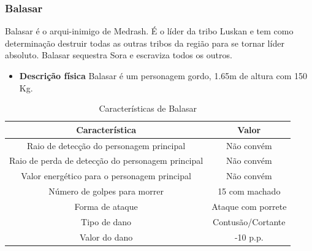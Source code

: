 \subsubsection{Balasar}
Balasar é o arqui-inimigo de Medrash. É o líder da tribo Luskan e tem como determinação destruir todas as outras tribos da região para se tornar líder absoluto. Balasar sequestra Sora e escraviza todos os outros.
\begin{itemize}
\item {\bf Descrição física}
Balasar é um personagem gordo, 1.65m de altura com 150 Kg.
\end{itemize}
\newpage
\begin{table}[H]
\begin{center}
\begin{tabular}{|c|c|}
\hline 
\textbf{Característica} & \textbf{Valor} \\ 
\hline 
Raio de detecção do personagem principal & Não convém \\ 
\hline 
Raio de perda de detecção do personagem principal & Não convém \\ 
\hline 
Valor energético para o personagem principal & Não convém \\ 
\hline 
Número de golpes para morrer & 15 com machado\\ 
\hline 
Forma de ataque & Ataque com porrete\\ 
\hline 
Tipo de dano &  Contusão/Cortante \\ 
\hline 
Valor do dano & -10 p.p. \\ 
\hline 
\end{tabular} 
\end{center}
\caption{Características de Balasar}
\label{table:balasar}
\end{table}
